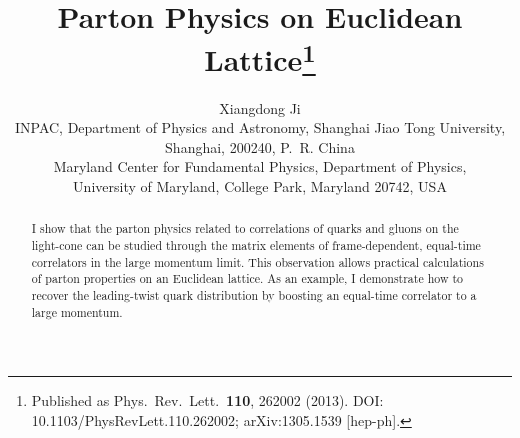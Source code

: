 \documentclass[11pt]{article}
\title{Parton Physics on Euclidean Lattice\thanks{Published as Phys.\ Rev.\ Lett.\ \textbf{110}, 262002 (2013).
DOI: 10.1103/PhysRevLett.110.262002; arXiv:1305.1539 [hep-ph].}}
\author{Xiangdong Ji\\[4pt]
\normalsize INPAC, Department of Physics and Astronomy, Shanghai Jiao Tong University,\\
\normalsize Shanghai, 200240, P.~R. China\\[2pt]
\normalsize Maryland Center for Fundamental Physics, Department of Physics,\\
\normalsize University of Maryland, College Park, Maryland 20742, USA}
\date{}
\begin{document}
\maketitle

\begin{abstract}
I show that the parton physics related to correlations of quarks and gluons on the light-cone
can be studied through the matrix elements of frame-dependent, equal-time correlators in
the large momentum limit. This observation allows practical calculations of parton properties
on an Euclidean lattice. As an example, I demonstrate how to recover the leading-twist
quark distribution by boosting an equal-time correlator to a large momentum.
\end{abstract}



\end{document}
